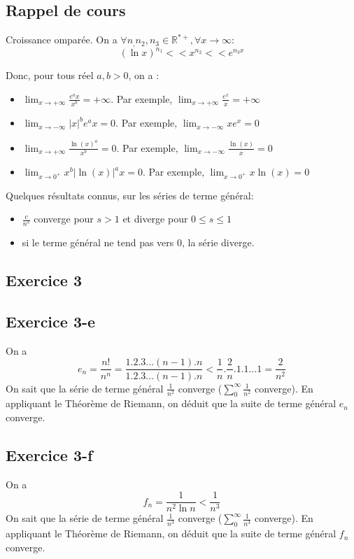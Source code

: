 \documentclass[]{book}
\theoremstyle{definition}
\newcommand{\bb}[1]{\mathbb{#1}}
\newcommand{\R}{\bb{R}}
\begin{document}
\subsection*{Rappel de cours}
Croissance ompar\'ee. On a $\forall n_, n_2, n_3 \in \R^{*+}, \forall x \to \infty$:
$$(\ln x)^{n_1} << x^{n_2} << e^{n_3 x}$$


Donc, pour tous r\'eel $a,b > 0$, on a :
\begin{itemize}
\item $\lim_{x \to +\infty}{\frac{e^ax}{x^b}} = +\infty$. Par exemple, $\lim_{x \to +\infty}{\frac{e^x}{x}} = +\infty$  
\item $\lim_{x \to -\infty}{|x|^{b}e^ax} = 0$. Par exemple, $\lim_{x \to -\infty}{xe^x} = 0$  
\item $\lim_{x \to +\infty}{\frac{\ln(x)^a}{x^b}} = 0$. Par exemple, $\lim_{x \to -\infty}{\frac{\ln(x)}{x}} = 0$  
\item $\lim_{x \to 0^{+}}{x^{b}|\ln(x)|^ax} = 0$. Par exemple, $\lim_{x \to 0^{+}}{x\ln(x)} = 0$  
\end{itemize}

Quelques r\'esultats connus, sur les s\'eries de terme g\'en\'eral:
\begin{itemize}
\item  $\frac{c}{n^s}$ converge pour $s > 1$ et diverge pour $0 \leq s \leq 1$
\item si le terme g\'en\'eral ne tend pas vers 0, la s\'erie diverge.
\end{itemize}


\newpage
\subsection*{Exercice 3}
\subsection*{Exercice 3-e}
On a 
$$e_n = \frac{n!}{n^n} = \frac{1.2.3 \ldots (n-1).n}{1.2.3 \ldots (n-1).n} < \frac{1}{n}.\frac{2}{n}.1.1\ldots 1 = \frac{2}{n^2}$$
On sait que la s\'erie de terme g\'en\'eral $\frac{1}{n^2}$ converge ($\sum_{0}^{\infty}{\frac{1}{n^2}}$ converge). En appliquant le Th\'eor\`eme de Riemann, on d\'eduit que la suite de terme g\'en\'eral $e_n$ converge.

\subsection*{Exercice 3-f}
On a 
$$f_n = \frac{1}{n^2 \ln n} < \frac{1}{n^3}$$
On sait que la s\'erie de terme g\'en\'eral $\frac{1}{n^3}$ converge ($\sum_{0}^{\infty}{\frac{1}{n^3}}$ converge). En appliquant le Th\'eor\`eme de Riemann, on d\'eduit que la suite de terme g\'en\'eral $f_n$ converge.
\end{document}
